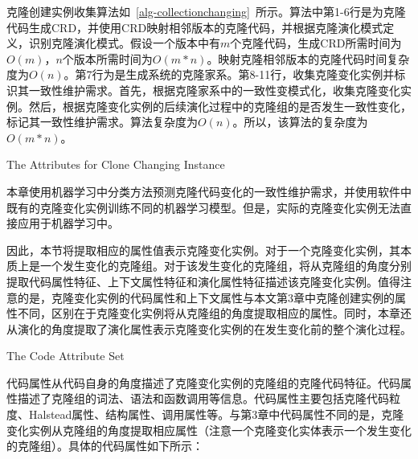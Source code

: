 克隆创建实例收集算法如~\ref{alg-collectionchanging}~所示。算法中第1-6行是为克隆代码生成CRD，并使用CRD映射相邻版本的克隆代码，并根据克隆演化模式定义，识别克隆演化模式。假设一个版本中有$m$个克隆代码，生成CRD所需时间为$O(m)$，$n$个版本所需时间为$O(m*n)$。映射克隆相邻版本的克隆代码时间复杂度为$O(n)$。第7行为是生成系统的克隆家系。第8-11行，收集克隆变化实例并标识其一致性维护需求。首先，根据克隆家系中的一致性变模式化，收集克隆变化实例。然后，根据克隆变化实例的后续演化过程中的克隆组的是否发生一致性变化，标记其一致性维护需求。算法复杂度为$O(n)$。所以，该算法的复杂度为$O(m*n)$。

{The Attributes for Clone Changing Instance}
\label{lab-changingattribute}

本章使用机器学习中分类方法预测克隆代码变化的一致性维护需求，并使用软件中既有的克隆变化实例训练不同的机器学习模型。但是，实际的克隆变化实例无法直接应用于机器学习中。

因此，本节将提取相应的属性值表示克隆变化实例。对于一个克隆变化实例，其本质上是一个发生变化的克隆组。对于该发生变化的克隆组，将从克隆组的角度分别提取代码属性特征、上下文属性特征和演化属性特征描述该克隆变化实例。值得注意的是，克隆变化实例的代码属性和上下文属性与本文第3章中克隆创建实例的属性不同，区别在于克隆变化实例将从克隆组的角度提取相应的属性。同时，本章还从演化的角度提取了演化属性表示克隆变化实例的在发生变化前的整个演化过程。

{The Code Attribute Set}

代码属性从代码自身的角度描述了克隆变化实例的克隆组的克隆代码特征。代码属性描述了克隆组的词法、语法和函数调用等信息。代码属性主要包括克隆代码粒度、Halstead属性、结构属性、调用属性等。与第3章中代码属性不同的是，克隆变化实例从克隆组的角度提取相应属性（注意一个克隆变化实体表示一个发生变化的克隆组）。具体的代码属性如下所示：

